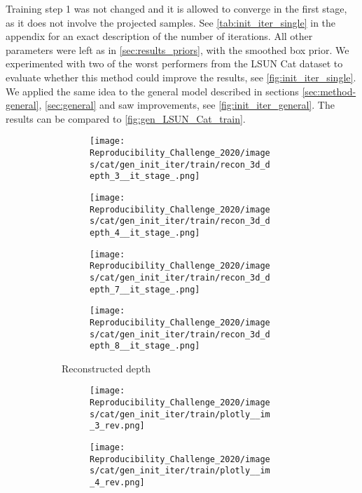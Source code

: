 Training step 1 was not changed and it is allowed to converge in the first stage, as it does not involve the projected samples. See \autoref{tab:init_iter_single} in the appendix for an exact description of the number of iterations. All other parameters were left as in \autoref{sec:results_priors}, with the smoothed box prior. We experimented with two of the worst performers from the LSUN Cat dataset to evaluate whether this method could improve the results, see \autoref{fig:init_iter_single}. We applied the same idea to the general model described in sections \ref{sec:method-general}, \ref{sec:general} and saw improvements, see \autoref{fig:init_iter_general}. The results can be compared to \autoref{fig:gen_LSUN_Cat_train}.
\begin{figure}[!htb]
\begin{subfigure}{\textwidth}
    \begin{subfigure}{0.24\textwidth}
    \centering
    \texttt{[image: Reproducibility\_Challenge\_2020/images/cat/gen\_init\_iter/train/recon\_3d\_depth\_3\_\_it\_stage\_.png]}
\end{subfigure}
\begin{subfigure}{0.24\textwidth}
    \centering
    \texttt{[image: Reproducibility\_Challenge\_2020/images/cat/gen\_init\_iter/train/recon\_3d\_depth\_4\_\_it\_stage\_.png]}
\end{subfigure}
\begin{subfigure}{0.24\textwidth}
    \centering
    \texttt{[image: Reproducibility\_Challenge\_2020/images/cat/gen\_init\_iter/train/recon\_3d\_depth\_7\_\_it\_stage\_.png]}
\end{subfigure}
\begin{subfigure}{0.24\textwidth}
    \centering
    \texttt{[image: Reproducibility\_Challenge\_2020/images/cat/gen\_init\_iter/train/recon\_3d\_depth\_8\_\_it\_stage\_.png]}
\end{subfigure}
    \caption{Reconstructed depth}
\end{subfigure}
\begin{subfigure}{\textwidth}
    \begin{subfigure}{0.24\textwidth}
    \centering
    \texttt{[image: Reproducibility\_Challenge\_2020/images/cat/gen\_init\_iter/train/plotly\_\_im\_3\_rev.png]}
\end{subfigure}
\begin{subfigure}{0.24\textwidth}
    \centering
    \texttt{[image: Reproducibility\_Challenge\_2020/images/cat/gen\_init\_iter/train/plotly\_\_im\_4\_rev.png]}

\end{subfigure}
\end{subfigure}
\end{figure}

